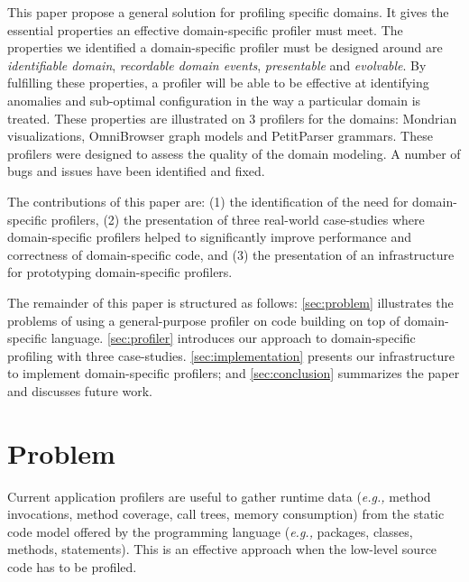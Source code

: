 \documentclass[runningheads]{llncs}
\newcommand{\ugh}[1]{\textcolor{red}{\uwave{#1}}} %
\newcommand{\lr}[1]{\nb{Lukas}{orange}{#1}}
\newcommand{\eg}{\emph{e.g.,}\xspace}
\newcommand{\seclabel}[1]{\label{sec:#1}}
\begin{document}


This paper propose a general solution for profiling specific domains. It gives the essential properties an effective domain-specific profiler must meet. 
The properties we identified a domain-specific profiler must be designed around are \emph{identifiable domain}, \emph{recordable domain events}, \emph{presentable} and \emph{evolvable}. By fulfilling these properties, a profiler will be able to be effective at identifying anomalies and sub-optimal configuration in the way a particular domain is treated.
These properties are illustrated on 3 profilers for the domains: Mondrian visualizations, OmniBrowser graph models and PetitParser grammars. These profilers were designed to assess the quality of the domain modeling. A number of bugs and issues have been identified and fixed.

The contributions of this paper are: (1) the identification of the need for domain-specific profilers, (2) the presentation of three real-world case-studies where domain-specific profilers helped to significantly improve performance and correctness of domain-specific code, and (3) the presentation of an infrastructure for prototyping domain-specific profilers.

The remainder of this paper is structured as follows: \autoref{sec:problem} illustrates the problems of using a general-purpose profiler on code building on top of domain-specific language. \autoref{sec:profiler} introduces our approach to domain-specific profiling with three case-studies. \autoref{sec:implementation} presents our infrastructure to implement domain-specific profilers; and \autoref{sec:conclusion} summarizes the paper and discusses future work.

\section{Problem}\seclabel{problem}

Current application profilers are useful to gather runtime data (\eg method invocations, method coverage, call trees, memory consumption) from the static code model offered by the programming language (\eg packages, classes, methods, statements). This is an effective approach when the low-level source code has to be profiled.
\end{document}
